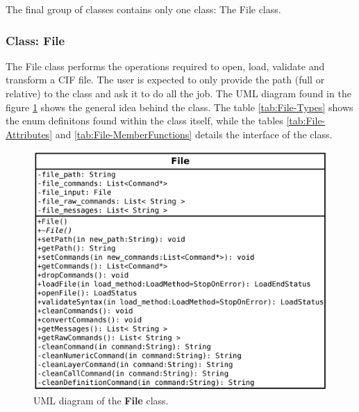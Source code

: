 \documentclass[11pt,twoside,openany,x11names,svgnames]{memoir}
\begin{document}
The final group of classes contains only one class: The File class.

\subsubsection{Class: File}\label{Class-File}

The File class performs the operations required to open, load, validate and transform a CIF file. The user is expected to only provide the path (full or relative) to the class and ask it to do all the job. The UML diagram found in the figure \ref{fig:class-file} shows the general idea behind the class. The table \ref{tab:File-Types} shows the enum definitons found within the class itself, while the tables \ref{tab:File-Attributes} and \ref{tab:File-MemberFunctions} details the interface of the class.

\begin{figure}
	\centering
	\includegraphics[scale=0.18, clip=true, trim= 0pt 0pt 0pt 0pt]{images/chapter03-image34}
	\caption{UML diagram of the \textbf{File} class.}
	\label{fig:class-file}
\end{figure}
\end{document}
